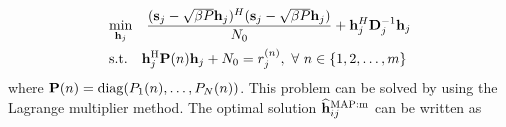 \documentclass[francais]{gretsi}
\newcommand{\diag}{\mathrm{diag}}
\begin{document}
\begin{equation}
\begin{split}
&\underset{\bold{h}_j}{\min}\quad \frac{(\bold{s}_j-\sqrt{\beta P}\bold{h}_j)^H(\bold{s}_j-\sqrt{\beta P}\bold{h}_j)}{N_0}+{\bold{h}_j^H\bold{D}_j^{-1}\bold{h}_j}\\
&\mathrm{s.t.} \quad \bold{h}_j^{\mathrm{H}}\bold{P}(n)\bold{h}_j+N_0=r_{j}^{(n)}, \,\, \forall \,\, n \in \{1,2,\dots,m\}
\end{split}
\label{eq:MAP_op_origin}
\end{equation}
where  $\bold{P}(n)=\diag (P_1(n),\dots,P_N(n))$. This problem can be solved by using the Lagrange multiplier method. The optimal solution $\widehat{\bold{h}}^{\text{MAP:m}}_{ij}$ can be written as
\end{document}
